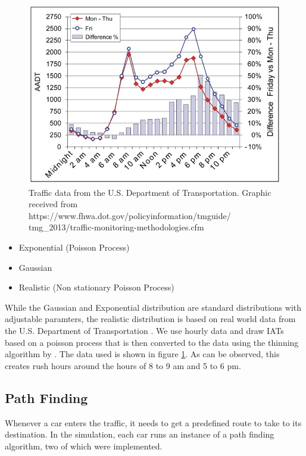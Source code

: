 \documentclass[10pt]{article}
\begin{document}
\begin{figure}[t]
	\includegraphics[width=\linewidth]{img/traffic-data.jpeg}
	\caption{Traffic data from the U.S. Department of Transportation. Graphic received from https://www.fhwa.dot.gov/policyinformation/tmguide/
	tmg\_2013/traffic-monitoring-methodologies.cfm \label{fig:traffic-data}}
\end{figure} 
 
\begin{itemize}
	\item Exponential (Poisson Process)
	\item Gaussian
	\item Realistic (Non stationary Poisson Process)
\end{itemize}
 
While the Gaussian and Exponential distribution are standard distributions with adjustable paramters, the realistic distribution is based on real world data from the U.S. Department of Transportation \citep{trafficdata}. We use hourly data and draw IATs based on a poisson process that is then converted to the data using the thinning algorithm by \citet{lewis1979simulation}. The data used is shown in figure \ref{fig:traffic-data}. As can be observed, this creates rush hours around the hours of 8 to 9 am and 5 to 6 pm.

\subsection{Path Finding}
Whenever a car enters the traffic, it needs to get a predefined route to take to its destination. In the simulation, each car runs an instance of a path finding algorithm, two of which were implemented.
\end{document}
